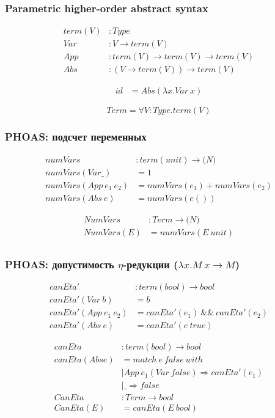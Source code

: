 \documentclass[xcolor=table]{beamer}
\begin{document}
\begin{frame}[fragile]
  \transwipe[direction=90]
  \frametitle{Parametric higher-order abstract syntax}
\begin{align*}
  term(V) &: Type \\
  Var    &: V \rightarrow term (V) \\
  App    &: term(V) \rightarrow term(V) \rightarrow term(V) \\
  Abs    &: (V \rightarrow term(V)) \rightarrow term(V)
\end{align*}

\begin{align*}
  id &= Abs (\lambda x . Var \ x )
\end{align*}

\[Term = \forall V : Type. term (V)\]

\end{frame}

\begin{frame}[fragile]
  \transwipe[direction=90]
  \frametitle{PHOAS: подсчет переменных}
\begin{align*}
numVars &: term(unit) \rightarrow \mathbb(N)  \\
numVars (Var \_) &= 1 \\
numVars (App \ e_1 \ e_2) &= numVars(e_1) + numVars(e_2) \\
numVars (Abs \ e) &= numVars (e ())
\end{align*}

\begin{align*}
NumVars &: Term \rightarrow \mathbb(N) \\
NumVars (E) &= numVars (E \ unit) \\
\end{align*}
\end{frame}

\begin{frame}[fragile]
  \transwipe[direction=90]
  \frametitle{PHOAS: допустимость $\eta$-редукции ($\lambda x. M \ x \rightarrow M$)}
\begin{align*}
canEta' &: term(bool) \rightarrow bool \\
canEta' (Var \ b) &= b \\
canEta' (App \ e_1 \ e_2) &= canEta'(e_1) \ \&\& \ canEta'(e_2) \\
canEta' (Abs \ e) &= canEta' (e \ true)
\end{align*}

\begin{align*}
  canEta &: term(bool) \rightarrow bool \\
  canEta (Abs e) &= match \ e \ false \ with \\
                 &\mid App \ e_1 (Var \ false) \Rightarrow canEta'(e_1) \\
                 &\mid \_ \Rightarrow false \\
  CanEta &: Term \rightarrow bool \\
  CanEta (E) &= canEta (E \ bool)
\end{align*}
\end{frame}
\end{document}
